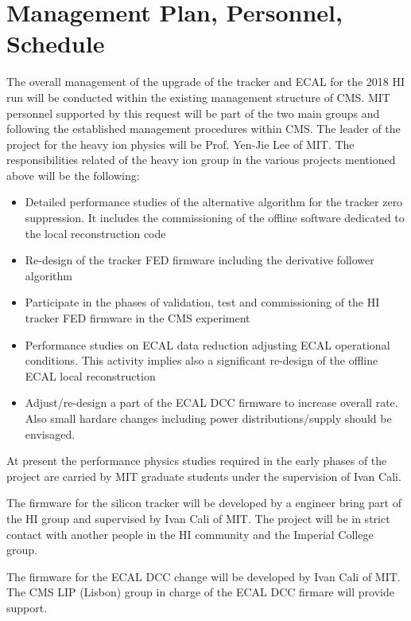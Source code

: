 \section{Management Plan, Personnel, Schedule}
\label{sec:management}

The overall management of the upgrade of the tracker and ECAL for the 2018 HI run will be conducted within the existing management structure of CMS. MIT personnel supported by this request will be part of the two main groups and following the established management procedures within CMS. The leader of the project for the heavy ion physics will be Prof. Yen-Jie Lee of MIT. The responsibilities related of the heavy ion group in the various projects mentioned above will be the following:

\begin{itemize}
\item Detailed performance studies of the alternative algorithm for the tracker zero suppression. It includes the
commissioning of the offline software dedicated to the local reconstruction code
\item Re-design of the tracker FED firmware including the derivative follower algorithm
\item Participate in the phases of validation, test and commissioning of the HI tracker FED firmware in the CMS experiment
\item Performance studies on ECAL data reduction adjusting ECAL operational conditions. This activity implies also a
significant re-design of the offline ECAL local reconstruction
\item Adjust/re-design a part of the ECAL DCC firmware to increase overall rate. Also small hardare changes including power distributions/supply should be envisaged. 
\end{itemize}

At present the performance physics studies required in the early phases of the project are carried by MIT graduate students under the supervision of Ivan Cali. 

 
The firmware for the silicon tracker will be developed by a engineer bring part of the HI group and supervised by Ivan Cali of MIT. The project will be in strict contact with another people in the HI community and the Imperial College group.

The firmware for the ECAL DCC change will be developed by Ivan Cali of MIT. The CMS LIP (Lisbon) group in charge of the ECAL DCC firmare will provide support.

